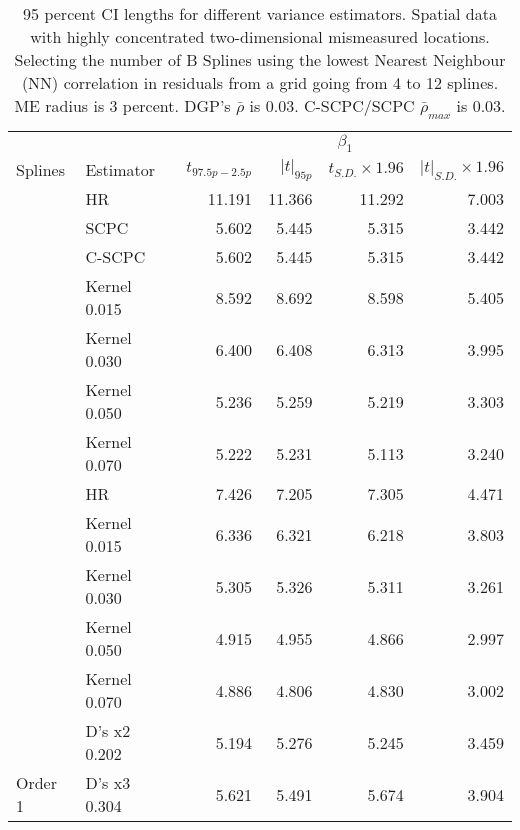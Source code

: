 \documentclass[
]{article}
\begin{document}
\newpage{}

\begin{longtable}[t]{llrrrr}

\caption{\label{tbl-lights-me-optimal-ci}95 percent CI lengths for
different variance estimators. Spatial data with highly concentrated
two-dimensional mismeasured locations. Selecting the number of B Splines
using the lowest Nearest Neighbour (NN) correlation in residuals from a
grid going from 4 to 12 splines. ME radius is 3 percent. DGP's
\(\bar\rho\) is 0.03. C-SCPC/SCPC \(\bar\rho_{max}\) is 0.03.}

\tabularnewline

\toprule
\multicolumn{2}{c}{ } & \multicolumn{4}{c}{\(\beta_1\)} \\
\cmidrule(l{3pt}r{3pt}){3-6}
Splines & Estimator & $t_{97.5p-2.5p} $ & $|t|_{95p} $ & $t_{S.D.}\times 1.96 $ & $|t|_{S.D.}\times 1.96 $\\
\midrule
 & HR & 11.191 & 11.366 & 11.292 & 7.003\\

 & SCPC & 5.602 & 5.445 & 5.315 & 3.442\\

 & C-SCPC & 5.602 & 5.445 & 5.315 & 3.442\\

 & Kernel 0.015 & 8.592 & 8.692 & 8.598 & 5.405\\

 & Kernel 0.030 & 6.400 & 6.408 & 6.313 & 3.995\\

 & Kernel 0.050 & 5.236 & 5.259 & 5.219 & 3.303\\

\multirow[t]{-7}{*}{\raggedright\arraybackslash } & Kernel 0.070 & 5.222 & 5.231 & 5.113 & 3.240\\
\cmidrule{1-6}
 & HR & 7.426 & 7.205 & 7.305 & 4.471\\

 & Kernel 0.015 & 6.336 & 6.321 & 6.218 & 3.803\\

 & Kernel 0.030 & 5.305 & 5.326 & 5.311 & 3.261\\

 & Kernel 0.050 & 4.915 & 4.955 & 4.866 & 2.997\\

 & Kernel 0.070 & 4.886 & 4.806 & 4.830 & 3.002\\

 & D's x2 0.202 & 5.194 & 5.276 & 5.245 & 3.459\\

\multirow[t]{-7}{*}{\raggedright\arraybackslash Order 1} & D's x3 0.304 & 5.621 & 5.491 & 5.674 & 3.904\\
\bottomrule

\end{longtable}
\end{document}
